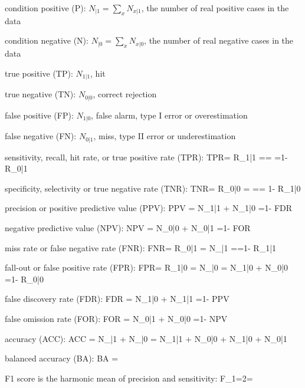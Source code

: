 condition positive (P):
$N_{|1}=\sum_x N_{x|1}$,
the number of real positive cases in the data

condition negative (N):
$N_{|0}=\sum_x N_{x|0}$,
the number of real negative cases in the data

true positive (TP):
$N_{1|1}$, hit

true negative (TN):
$N_{0|0}$, correct rejection

false positive (FP):
$N_{1|0}$, false alarm, type I error or overestimation

false negative (FN):
$N_{0|1}$, miss, type II error or underestimation

sensitivity, recall, hit rate, or true positive rate 
(TPR):
\beq TPR=
{  {R_{1|1}} ={}=
{}=1- {R_{0|1}} }
\eeq

specificity, selectivity or true negative rate (TNR):
\beq TNR=
{  {R_{0|0}} ={}
={}=
1- {R_{1|0}} }
\eeq

precision or positive predictive value (PPV):
\beq 
{  {PPV} ={
{ {N_{1|1}} + {N_{1|0}} }}=1- {FDR} }
\eeq

negative predictive value (NPV):
\beq 
{  {NPV} ={
{ {N_{0|0}} + {N_{0|1}} }}=1- {FOR} }
\eeq

miss rate or false negative rate (FNR):
\beq FNR=
{  {R_{0|1}} ={
{ {N_{|1}} }}={}=1- {R_{1|1}} }
\eeq

fall-out or false positive rate (FPR):
\beq FPR=
{  {R_{1|0}} ={
{ {N_{|0}} }}={
{ {N_{1|0}} + {N_{0|0}} }}=1- {R_{0|0}} }
\eeq

false discovery rate (FDR):
\beq 
{  {FDR} ={
{ {N_{1|0}} + {N_{1|1}} }}=1- {PPV} }
\eeq

false omission rate (FOR):
\beq 
{  {FOR} ={
{ {N_{0|1}} + {N_{0|0}} }}=1- {NPV} }
\eeq


accuracy (ACC):
\beq 
{  {ACC} ={
{ {N_{|1}} + {N_{|0}} }}={
{ {N_{1|1}} + {N_{0|0}} + {N_{1|0}} + {N_{0|1}}
 }}}
\eeq

balanced accuracy (BA):
\beq 
{  {BA} ={}}
\eeq

F1 score
is the harmonic mean of precision and sensitivity: 
\beq 
{  {F}_{1}=2=
{}}
\eeq

